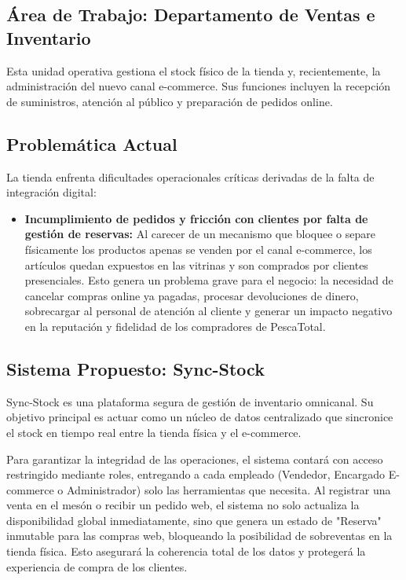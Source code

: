 \documentclass[12pt,a4paper]{article}
\begin{document}
\subsection{Área de Trabajo: Departamento de Ventas e Inventario}
Esta unidad operativa gestiona el stock físico de la tienda y, recientemente, la administración del nuevo canal e-commerce. Sus funciones incluyen la recepción de suministros, atención al público y preparación de pedidos online.

\subsection{Problemática Actual}
La tienda enfrenta dificultades operacionales críticas derivadas de la falta de integración digital:
\begin{itemize}
    \item \textbf{Incumplimiento de pedidos y fricción con clientes por falta de gestión de reservas:} Al carecer de un mecanismo que bloquee o separe físicamente los productos apenas se venden por el canal e-commerce, los artículos quedan expuestos en las vitrinas y son comprados por clientes presenciales. Esto genera un problema grave para el negocio: la necesidad de cancelar compras online ya pagadas, procesar devoluciones de dinero, sobrecargar al personal de atención al cliente y generar un impacto negativo en la reputación y fidelidad de los compradores de PescaTotal.
\end{itemize}

\subsection{Sistema Propuesto: Sync-Stock}
Sync-Stock es una plataforma segura de gestión de inventario omnicanal. Su objetivo principal es actuar como un núcleo de datos centralizado que sincronice el stock en tiempo real entre la tienda física y el e-commerce.

Para garantizar la integridad de las operaciones, el sistema contará con acceso restringido mediante roles, entregando a cada empleado (Vendedor, Encargado E-commerce o Administrador) solo las herramientas que necesita. Al registrar una venta en el mesón o recibir un pedido web, el sistema no solo actualiza la disponibilidad global inmediatamente, sino que genera un estado de "Reserva" inmutable para las compras web, bloqueando la posibilidad de sobreventas en la tienda física. Esto asegurará la coherencia total de los datos y protegerá la experiencia de compra de los clientes.
\end{document}
